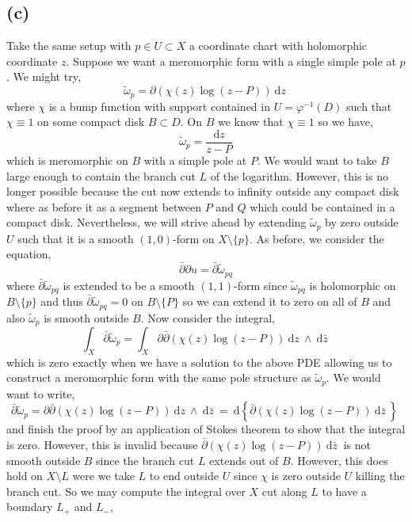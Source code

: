 \documentclass[12pt]{extarticle}
\renewcommand{\d}[1]{\: \mathrm{d}#1 \:}
\theoremstyle{definition}
\begin{document}
\subsection*{(c)}

Take the same setup with $p \in U \subset X$ a coordinate chart with holomorphic coordinate $z$. Suppose we want a meromorphic form with a single simple pole at $p$. We might try,
\[ \tilde{\omega}_{p} = \partial \left( \chi(z) \log{\left( z - P \right)} \right) \d{z} \]
where $\chi$ is a bump function with support contained in $U = \varphi^{-1}(D)$ such that $\chi \equiv 1$ on some compact disk $B \subset D$. On $B$ we know that $\chi \equiv 1$ so we have,
\[ \tilde{\omega}_p = \frac{\d{z}}{z - P} \] 
which is meromorphic on $B$ with a simple pole at $P$. We would want to take $B$ large enough to contain the branch cut $L$ of the logarithm. However, this is no longer possible because the cut now extends to infinity outside any compact disk where as before it as a segment between $P$ and $Q$ which could be contained in a compact disk. Nevertheless, we will strive ahead by extending $\tilde{\omega}_p$ by zero outside $U$ such that it is a smooth $(1,0)$-form on $X \setminus \{p\}$. As before, we consider the equation,
\[ \bar{\partial} \partial u = \bar{\partial} \tilde{\omega}_{pq} \]
where $\bar{\partial} \tilde{\omega}_{pq}$ is extended to be a smooth $(1,1)$-form since $\tilde{\omega}_{pq}$ is holomorphic on $B \setminus \{p\}$ and thus $\bar{\partial} \tilde{\omega}_{pq} = 0$ on $B \setminus \{P \}$ so we can extend it to zero on all of $B$ and also  $\tilde{\omega}_p$ is smooth outside $B$. Now consider the integral,
\[ \int_X \bar{\partial} \tilde{\omega}_{p} = \int_X  \partial \bar{\partial} \left( \chi(z) \log{(z - P)} \right) \d{z} \wedge \d{\bar{z}} \]
which is zero exactly when we have a solution to the above PDE allowing us to construct a meromorphic form with the same pole structure as $\tilde{\omega}_p$. We would want to write,
\[ \bar{\partial} \tilde{\omega}_p = \partial \bar{\partial} \left( \chi(z) \log{(z - P)} \right) \d{z} \wedge \d{\bar{z}} = \d{ \left\{ \bar{\partial} \left( \chi(z) \log{(z - P)} \right) \d{\bar{z}} \right\} } \]
and finish the proof by an application of Stokes theorem to show that the integral is zero. However, this is invalid because $\bar{\partial} \left( \chi(z) \log{(z - P)} \right) \d{\bar{z}}$ is not smooth outside $B$ since the branch cut $L$ extends out of $B$. However, this does hold on $X \setminus L$ were we take $L$ to end outside $U$ since $\chi$ is zero outside $U$ killing the branch cut. So we may compute the integral over $X$ cut along $L$ to have a boundary $L_{+}$ and $L_{-}$,
\end{document}
